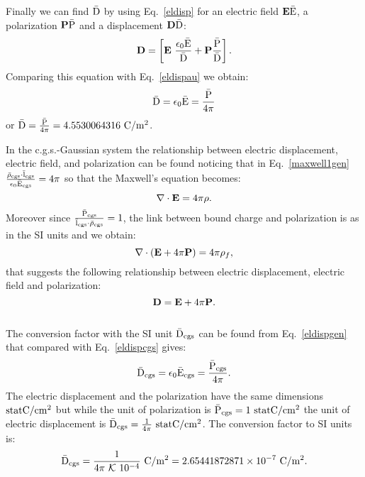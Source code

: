 \documentclass[12pt,a4paper,twoside]{report}
\def\bard{4.5530064316}
\def\dtod{2.65441872871\times 10^{-7}}
\begin{document}
{{Finally we can find ${\rm \bar D}$ by using Eq.~\ref{eldisp} for an electric
field ${\bf E} {\rm \bar E}$, a polarization ${\bf P} {\rm \bar P}$ and a
displacement ${\bf D} {\rm \bar D}$:
\begin{equation}
{\bf D} = \left[{\bf E}\ {\epsilon_0 {\rm \bar E}\over {\rm \bar D}} + 
{\bf P} {{\rm \bar P}\over {\rm \bar D}}\right].
\label{eldispgen}
\end{equation}
Comparing this equation with Eq.~\ref{eldispau} we obtain:
\begin{equation}
{\rm \bar D}= {\epsilon_0 {\rm \bar E}}= {{\rm \bar P} \over 4 \pi}
\end{equation}
or ${\rm \bar D}= {{\rm \bar P}\over 4 \pi}=\bard\ {\rm C}/{\rm m}^2$.
\\
}

{\color{orange} In the c.g.s.-Gaussian system the relationship
between electric displacement, electric field, and polarization can 
be found noticing that in Eq.~\ref{maxwell1gen}
${{\rm \bar \rho_{cgs}}\cdot {\rm \bar l_{cgs}} \over \epsilon_0 {\rm \bar E_{cgs}}}=4\pi$
so that the Maxwell's equation becomes:
\begin{equation}
\nabla \cdot {\bf E} = 4 \pi \rho.
\end{equation}
Moreover since ${{\rm \bar P_{cgs}} \over {\rm \bar l_{cgs}}\cdot {\rm \bar \rho_{cgs}}}=1$,
the link between bound charge and polarization is as in the SI units and
we obtain:
\begin{equation}
\nabla \cdot ({\bf E}+ 4 \pi {\bf P})=4 \pi \rho_f, 
\end{equation}
that suggests the following relationship between electric displacement,
electric field and polarization:
\begin{equation}
{\bf D} =  {\bf E} + 4 \pi {\bf P}.
\label{eldispcgs}
\end{equation}
\\
The conversion factor with the SI unit ${\rm \bar D_{cgs}}$ can be found
from Eq.~\ref{eldispgen} that compared with Eq.~\ref{eldispcgs} gives:
\begin{equation}
{\rm \bar D_{cgs}}= {\epsilon_0 {\rm \bar E_{cgs}}}= {{\rm \bar P_{cgs}} \over 4 \pi}.
\end{equation}
The electric displacement and the polarization 
have the same dimensions ${\rm statC}/{\rm cm}^2$ but while the unit of polarization
is ${\rm \bar P_{cgs}}=1\ {\rm statC}/{\rm cm}^2$ the unit of electric displacement 
is ${\rm \bar D_{cgs}}={1\over 4 \pi}\ {\rm statC}/{\rm cm}^2$.
The conversion factor to SI units is:
\begin{equation}
{\rm \bar D_{cgs}}= {1\over 4 \pi\ \mathcal{K}\ 10^{-4}}\ {\rm C}/{\rm m}^2=\dtod\ {\rm C}/{\rm m}^2. 
\end{equation}
}
\\

}
\end{document}
